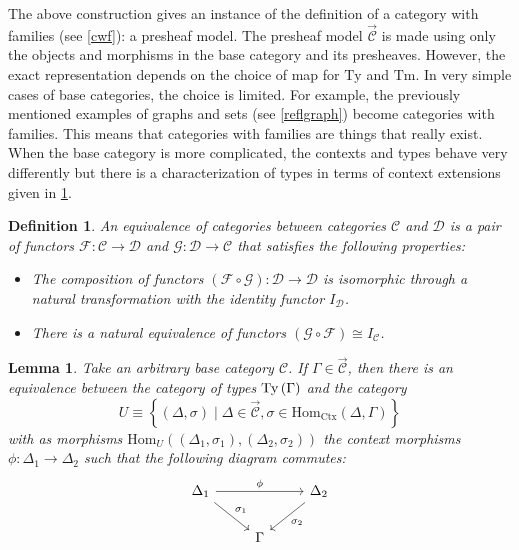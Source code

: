 \documentclass[12pt,a4paper,twoside,xetex]{book} %
\newcommand{\keyword}[1]{\emph{#1}\index{#1}}
\newtheorem{lemma}[theorem]{Lemma}
\newtheorem{definition}[theorem]{Definition}
\newcommand{\psh}[1]{\overrightarrow{#1}}
\newcommand{\homo}[3]{\text{Hom}_{#1}\left(#2,#3\right)}
\begin{document}
The above construction gives an instance of the definition of a category with 
families (see \cref{cwf}): a presheaf model. The presheaf model $\psh{\mathcal{C}}$ is made using only the 
objects and morphisms in the base category and its presheaves. However, the 
exact representation depends on the choice of map for $\text{Ty}$ and 
$\text{Tm}$. In very simple cases of base categories, the choice is limited. 
For example, the previously mentioned examples of graphs and sets (see \cref{reflgraph}) become 
categories with families. This means that categories with families are things 
that really exist. When the base category is more complicated, the contexts and 
types behave very differently but there is a characterization of types in terms 
of context extensions given in \cref{typelemma}.

\begin{definition}
An \keyword{equivalence of categories} between categories $\mathcal{C}$ and 
$\mathcal{D}$ is a pair of functors $\mathcal{F}:\mathcal{C} \rightarrow 
\mathcal{D}$ and $\mathcal{G}:\mathcal{D} \rightarrow \mathcal{C}$ that 
satisfies the following properties:
\begin{itemize}

\item The composition of functors $(\mathcal{F} \circ \mathcal{G}) : 
\mathcal{D} \rightarrow \mathcal{D}$ is isomorphic through a natural 
transformation with the identity functor $I_{\mathcal{D}}$. 

\item There is a natural equivalence of functors $(\mathcal{G} \circ 
\mathcal{F}) \cong I_{\mathcal{C}}$.
\end{itemize} 
\end{definition}

\begin{lemma}\label{typelemma}
Take an arbitrary base category $\mathcal{C}$. If $\Gamma \in 
\psh{\mathcal{C}}$, then there is an equivalence between the  category of types 
$\text{Ty}\left(\Gamma\right)$ and the category $$ U \equiv \left\{ (\Delta, \sigma) \mid \Delta 
\in \psh{\mathcal{C}}, \sigma \in \text{Hom}_{\text{Ctx}}(\Delta , \Gamma) 
\right\}$$ with as morphisms $\homo{U}{(\Delta_1, \sigma_1)}{(\Delta_2, 
\sigma_2)}$ the context morphisms $\phi: \Delta _1 \rightarrow \Delta _2$ such 
that the following diagram commutes: 
\[ \begin{tikzcd}
\Delta_1 \arrow[dr, "\sigma_1"] \arrow[rr, "\phi"]
& & \Delta_2
\arrow[dl, "\sigma_2"] \\
& \Gamma 
\end{tikzcd}
\]

\end{lemma}
\end{document}
